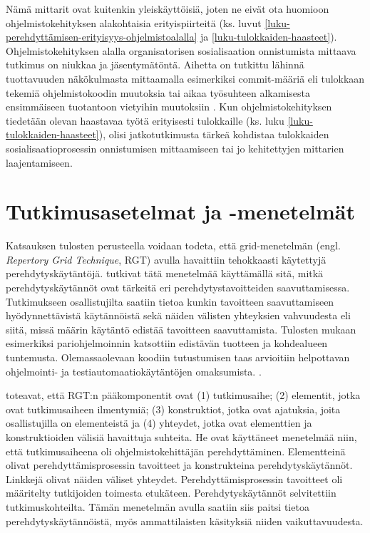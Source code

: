 \documentclass[utf8]{gradu3}
\begin{document}
Nämä mittarit ovat kuitenkin yleiskäyttöisiä, joten ne eivät ota huomioon ohjelmistokehityksen alakohtaisia erityispiirteitä (ks. luvut \ref{luku-perehdyttämisen-erityisyys-ohjelmistoalalla} ja \ref{luku-tulokkaiden-haasteet}). Ohjelmistokehityksen alalla organisatorisen sosialisaation onnistumista mittaava tutkimus on niukkaa ja jäsentymätöntä. Aihetta on tutkittu lähinnä tuottavuuden näkökulmasta mittaamalla esimerkiksi commit-määriä eli tulokkaan tekemiä ohjelmistokoodin muutoksia tai aikaa työsuhteen alkamisesta ensimmäiseen tuotantoon vietyihin muutoksiin \parencites%
    {rastogi-ym-2017}%
    {fagerholm-ym-2013}%
\relax.
% 
Kun ohjelmistokehityksen tiedetään olevan haastavaa työtä erityisesti tulokkaille (ks. luku \ref{luku-tulokkaiden-haasteet}), olisi jatkotutkimusta tärkeä kohdistaa tulokkaiden sosialisaatioprosessin onnistumisen mittaamiseen tai jo kehitettyjen mittarien laajentamiseen.



\section{Tutkimusasetelmat ja -menetelmät}

Katsauksen tulosten perusteella voidaan todeta, että grid-menetelmän (engl. \textit{Repertory Grid Technique}, RGT) avulla havaittiin tehokkaasti käytettyjä perehdytyskäytäntöjä. \textcite{buchan-ym-2019} tutkivat tätä menetelmää käyttämällä sitä, mitkä perehdytyskäytännöt ovat tärkeitä eri perehdytystavoitteiden saavuttamisessa. Tutkimukseen osallistujilta saatiin tietoa kunkin tavoitteen saavuttamiseen hyödynnettävistä käytännöistä sekä näiden välisten yhteyksien vahvuudesta eli siitä, missä määrin käytäntö edistää tavoitteen saavuttamista. Tulosten mukaan esimerkiksi pariohjelmoinnin katsottiin edistävän tuotteen ja kohdealueen tuntemusta. Olemassaolevaan koodiin tutustumisen taas arvioitiin helpottavan ohjelmointi- ja testiautomaatiokäytäntöjen omaksumista. \parencite{buchan-ym-2019}.

\textcite{buchan-ym-2019} toteavat, että RGT:n pääkomponentit ovat (1) tutkimusaihe; (2) elementit, jotka ovat tutkimusaiheen ilmentymiä; (3) konstruktiot, jotka ovat ajatuksia, joita osallistujilla on elementeistä ja (4) yhteydet, jotka ovat elementtien ja konstruktioiden välisiä havaittuja suhteita. He ovat  käyttäneet menetelmää niin, että tutkimusaiheena oli ohjelmistokehittäjän perehdyttäminen. Elementteinä olivat perehdyttämisprosessin tavoitteet ja konstrukteina perehdytyskäytännöt. Linkkejä olivat näiden väliset yhteydet. Perehdyttämisprosessin tavoitteet oli määritelty tutkijoiden toimesta etukäteen. Perehdytyskäytännöt selvitettiin tutkimuskohteilta. Tämän menetelmän avulla saatiin siis paitsi tietoa perehdytyskäytännöistä, myös ammattilaisten käsityksiä niiden vaikuttavuudesta. 
\end{document}
